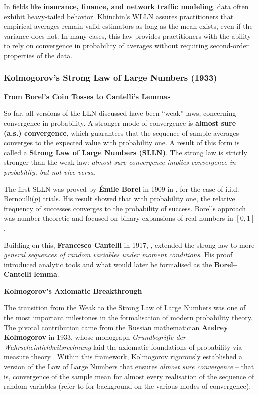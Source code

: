 In fields like \textbf{insurance, finance, and network traffic modeling}, data often exhibit heavy-tailed behavior. Khinchin’s WLLN assures practitioners that empirical averages remain valid estimators as long as the mean exists, even if the variance does not. In many cases, this law provides practitioners with the ability to rely on convergence in probability of averages without requiring second-order properties of the data. 

\vspace{-1em}

\subsubsection{Kolmogorov's Strong Law of Large Numbers (1933)}

\noindent\textbf{From Borel’s Coin Tosses to Cantelli’s Lemmas}
\vspace{0.5em}

So far, all versions of the LLN discussed have been “weak” laws, concerning convergence in probability. A stronger mode of convergence is \textbf{almost sure (a.s.) convergence}, which guarantees that the sequence of sample averages converges to the expected value with probability one. A result of this form is called a \textbf{Strong Law of Large Numbers (SLLN)}. The strong law is strictly stronger than the weak law: \textit{almost sure convergence implies convergence in probability, but not vice versa.}

The first SLLN was proved by \textbf{Émile Borel} in 1909 in \cite{Borel1909}, for the case of i.i.d. Bernoulli($p$) trials. His result showed that with probability one, the relative frequency of successes converges to the probability of success. Borel’s approach was number-theoretic and focused on binary expansions of real numbers in $[0,1]$.

Building on this, \textbf{Francesco Cantelli} in 1917, \cite{Cantelli1917}, extended the strong law to more \textit{general sequences of random variables under moment conditions}. His proof introduced analytic tools and what would later be formalised as the \textbf{Borel–Cantelli lemma}.

\vspace{1em}
\noindent\textbf{Kolmogorov’s Axiomatic Breakthrough}
\vspace{0.5em}

The transition from the Weak to the Strong Law of Large Numbers was one of the most important milestones in the formalisation of modern probability theory. The pivotal contribution came from the Russian mathematician \textbf{Andrey Kolmogorov} in 1933, whose monograph \emph{Grundbegriffe der Wahrscheinlichkeitsrechnung} laid the \newline axiomatic foundations of probability via measure theory \citep{Kolmogorov1933}. Within this framework, Kolmogorov rigorously established a version of the Law of Large Numbers that ensures \textit{almost sure convergence} -- that is, convergence of the sample mean for almost every realisation of the sequence of random variables (refer to \cite{proschan2018essentials} for background on the various modes of convergence).

